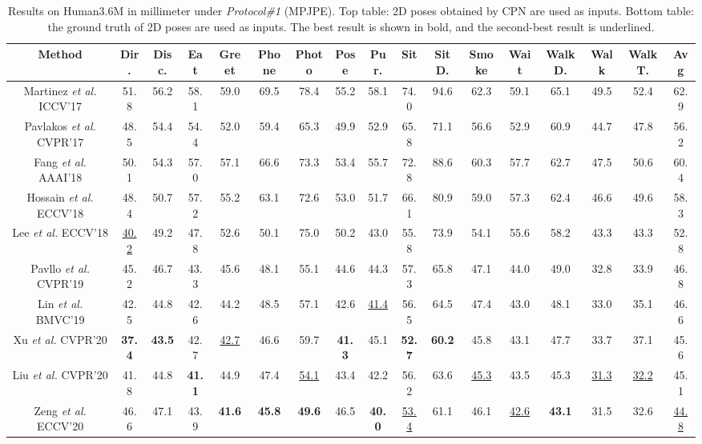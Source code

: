 \documentclass[sigconf]{acmart}
\begin{document}
\begin{table*}[ht]\small
  \centering
  \renewcommand\tabcolsep{4.0pt}
  \caption{Results on Human3.6M in millimeter under \textit{Protocol\#1} (MPJPE). Top table: 2D poses obtained by CPN are used as inputs. Bottom table: the ground truth of 2D poses are used as inputs. The best result is shown in bold, and the second-best result is underlined.}
\begin{tabular}{c|ccccccccccccccc|c}
    \toprule
    Method & Dir. & Disc. & Eat & Greet & Phone & Photo & Pose & Pur. & Sit & SitD. & Smoke & Wait & WalkD. & Walk & WalkT. & Avg \\
    \midrule
    Martinez \textit{et al.} \cite{martinez2017simple} ICCV'17 & 51.8&56.2&58.1&59.0&69.5&78.4&55.2&58.1&74.0&94.6&62.3&59.1&65.1&49.5&52.4&62.9 \\
    Pavlakos \textit{et al.} \cite{pavlakos2017coarse} CVPR'17& 48.5&54.4&54.4&52.0&59.4&65.3&49.9&52.9&65.8&71.1&56.6&52.9&60.9&44.7&47.8&56.2 \\
    Fang \textit{et al.} \cite{fang2018learning} AAAI'18& 50.1&54.3&57.0&57.1&66.6&73.3&53.4&55.7&72.8&88.6&60.3&57.7&62.7&47.5&50.6&60.4 \\
    Hossain \textit{et al.} \cite{hossain2018exploiting} ECCV'18& 48.4&50.7&57.2&55.2&63.1&72.6&53.0&51.7&66.1&80.9&59.0&57.3&62.4&46.6&49.6&58.3 \\
    Lee \textit{et al.} \cite{lee2018propagating} ECCV'18& \underline{40.2}&49.2&47.8&52.6&50.1&75.0&50.2&43.0&55.8&73.9&54.1&55.6&58.2&43.3&43.3&52.8 \\
    Pavllo \textit{et al.} \cite{jllo20193d} CVPR'19& 45.2&46.7&43.3&45.6&48.1&55.1&44.6&44.3&57.3&65.8&47.1&44.0&49.0&32.8&33.9&46.8 \\
    Lin \textit{et al.} \cite{lin2019trajectory} BMVC'19& 42.5&44.8&42.6&44.2&48.5&57.1&42.6&\underline{41.4}&56.5&64.5&47.4&43.0&48.1&33.0&35.1&46.6 \\
    Xu \textit{et al.} \cite{xu2020deep} CVPR'20
    &\textbf{37.4}&\textbf{43.5}&42.7&\underline{42.7}&46.6&59.7&\textbf{41.3}&45.1&\textbf{52.7}&\textbf{60.2}&45.8&43.1&47.7&33.7&37.1&45.6\\
    Liu \textit{et al.} \cite{liu2020attention} CVPR'20& 41.8&44.8&\textbf{41.1}&44.9&47.4&\underline{54.1}&43.4&42.2&56.2&63.6&\underline{45.3}&43.5&45.3&\underline{31.3}&\underline{32.2}&45.1 \\
    Zeng \textit{et al.} \cite{zeng2020srnet} ECCV'20& 46.6&47.1&43.9&\textbf{41.6}&\textbf{45.8}&\textbf{49.6}&46.5&\textbf{40.0}&\underline{53.4}&61.1&46.1&\underline{42.6}&\textbf{43.1}&31.5&32.6&\underline{44.8} \\


\end{tabular}
\end{table*}
\end{document}
